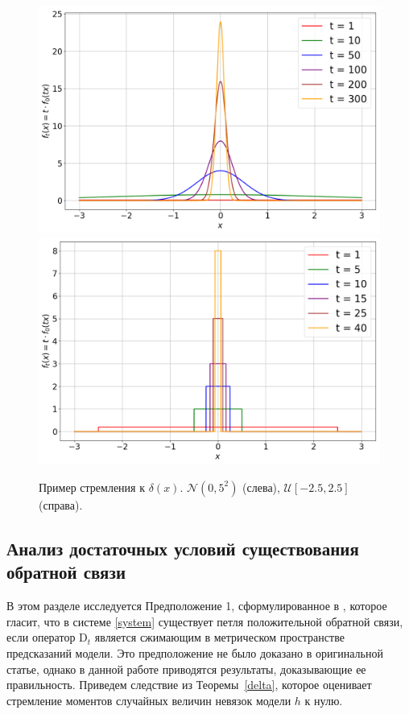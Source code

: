         \begin{figure}[h!]
            \centering
            \includegraphics[width = 0.4\linewidth]{pictures/fig1_Normal.png}
            \includegraphics[width = 0.4\linewidth]{pictures/fig1_Uniform.png}
            
            \caption{Пример стремления к $\delta(x)$. $\mathcal{N}(0, 5^2)$ (слева), $\mathcal{U}[-2.5, 2.5]$ (справа).}
            \label{example1_fig}
        \end{figure}

    \subsection{Анализ достаточных условий существования обратной связи}

            В этом разделе исследуется Предположение 1, сформулированное в \cite{khritankov2021hidden}, которое гласит, что в системе \eqref{system} существует петля положительной обратной связи, если оператор $\text{D}_t$ является сжимающим в метрическом пространстве предсказаний модели. Это предположение не было доказано в оригинальной статье, однако в данной работе приводятся результаты, доказывающие ее правильность. Приведем следствие из Теоремы~\ref{delta}, которое оценивает стремление моментов случайных величин невязок модели $h$ к нулю. 
    
